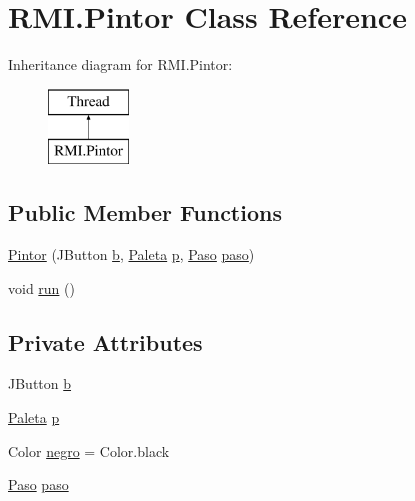 \hypertarget{class_r_m_i_1_1_pintor}{}\section{R\+M\+I.\+Pintor Class Reference}
\label{class_r_m_i_1_1_pintor}
Inheritance diagram for R\+M\+I.\+Pintor\+:\begin{figure}[H]
\begin{center}
\leavevmode
\includegraphics[height=2.000000cm]{class_r_m_i_1_1_pintor}
\end{center}
\end{figure}
\subsection*{Public Member Functions}
\begin{DoxyCompactItemize}
\item 
\mbox{\hyperlink{class_r_m_i_1_1_pintor_a1195b9e16a6f759a7ea874d7cc09bbcc}{Pintor}} (J\+Button \mbox{\hyperlink{class_r_m_i_1_1_pintor_a00126f610dce8cd5c3fcf4ea2309515a}{b}}, \mbox{\hyperlink{class_r_m_i_1_1_paleta}{Paleta}} \mbox{\hyperlink{class_r_m_i_1_1_pintor_a118c7fad449f069021ee68c9630a123c}{p}}, \mbox{\hyperlink{class_r_m_i_1_1_paso}{Paso}} \mbox{\hyperlink{class_r_m_i_1_1_pintor_a35cc7de76884e55f51a3779eb294e303}{paso}})
\item 
void \mbox{\hyperlink{class_r_m_i_1_1_pintor_a52929a5c38a23517fdff48753818d5b6}{run}} ()
\end{DoxyCompactItemize}
\subsection*{Private Attributes}
\begin{DoxyCompactItemize}
\item 
J\+Button \mbox{\hyperlink{class_r_m_i_1_1_pintor_a00126f610dce8cd5c3fcf4ea2309515a}{b}}
\item 
\mbox{\hyperlink{class_r_m_i_1_1_paleta}{Paleta}} \mbox{\hyperlink{class_r_m_i_1_1_pintor_a118c7fad449f069021ee68c9630a123c}{p}}
\item 
Color \mbox{\hyperlink{class_r_m_i_1_1_pintor_aa79e4aaa47549a4e3903f94e34b9fe6b}{negro}} = Color.\+black
\item 
\mbox{\hyperlink{class_r_m_i_1_1_paso}{Paso}} \mbox{\hyperlink{class_r_m_i_1_1_pintor_a35cc7de76884e55f51a3779eb294e303}{paso}}
\end{DoxyCompactItemize}


